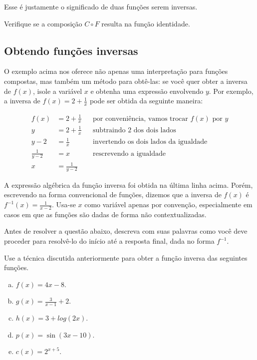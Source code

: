 \documentclass[main_estudante.tex]{subfiles}
\begin{document}
Esse é justamente o significado de duas funções serem inversas. 

\begin{questao}
Verifique se a composição $C \circ F$ resulta na função identidade.
\end{questao}

\subsection*{Obtendo funções inversas} %

O exemplo acima nos oferece não apenas uma interpretação para funções compostas, mas também um método para obtê-las: se você quer obter a inversa de $f(x)$, isole a variável $x$ e obtenha uma expressão envolvendo $y$. Por exemplo, a inversa de $f(x)=2+\frac{1}{x}$ pode ser obtida da seguinte maneira:

\begin{align*}
 f(x) &=2+\frac{1}{x} && \text{por conveniência, vamos trocar } f(x) \text{ por } y \\
 y &= 2+\frac{1}{x} && \text{subtraindo 2 dos dois lados}\\ 
 y-2 &= \frac{1}{x}  && \text{invertendo os dois lados da igualdade}\\
 \frac{1}{y-2} &= x && \text{rescrevendo a igualdade}\\
 x &= \frac{1}{y-2}
\end{align*}

A expressão algébrica da função inversa foi obtida na última linha acima. Porém, escrevendo na forma convencional de funções, dizemos que a inversa de $f(x)$ é $f^{-1}(x)=\frac{1}{x-2}$. Usa-se $x$ como variável apenas por convenção, especialmente em casos em que as funções são dadas de forma não contextualizadas.

\begin{reflita}
Antes de resolver a questão abaixo, descreva com suas palavras como você deve proceder para resolvê-lo do início até a resposta final, dada no forma $f^{-1}$. 
\end{reflita}

\begin{questao}
Use a técnica discutida anteriormente para obter a função inversa das seguintes funções.
\begin{enumerate}[a)]
\item $f(x)=4x-8$.
\item $g(x)=\frac{3}{x-1}+2$.
\item $h(x)=3+log(2x)$.
\item $p(x)=\sin(3x-10)$.
\item $c(x)=2^{x+5}$.
\end{enumerate}
\end{questao}
\end{document}
